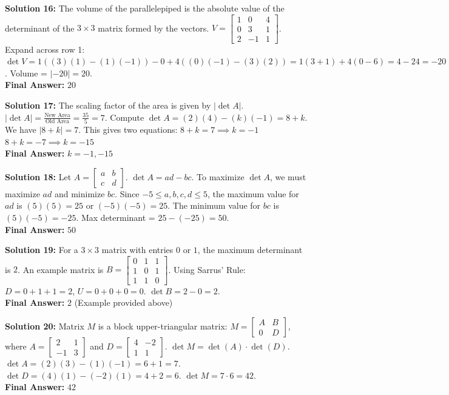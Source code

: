 \documentclass[11pt]{article}
\begin{document}
\vspace{0.5cm}
\textbf{Solution 16:}
The volume of the parallelepiped is the absolute value of the determinant of the $3 \times 3$ matrix formed by the vectors.
$V = \begin{bmatrix} 1 & 0 & 4 \\ 0 & 3 & 1 \\ 2 & -1 & 1 \end{bmatrix}$.
Expand across row 1:
$\det V = 1((3)(1) - (1)(-1)) - 0 + 4((0)(-1) - (3)(2)) = 1(3 + 1) + 4(0 - 6) = 4 - 24 = -20$.
Volume = $|-20| = 20$. \\
\textbf{Final Answer:} $20$

\vspace{0.5cm}
\textbf{Solution 17:}
The scaling factor of the area is given by $|\det A|$.
$|\det A| = \frac{\text{New Area}}{\text{Old Area}} = \frac{35}{5} = 7$.
Compute $\det A = (2)(4) - (k)(-1) = 8 + k$.
We have $|8 + k| = 7$. This gives two equations:
$8 + k = 7 \implies k = -1$
$8 + k = -7 \implies k = -15$ \\
\textbf{Final Answer:} $k = -1, -15$

\vspace{0.5cm}
\textbf{Solution 18:}
Let $A = \begin{bmatrix} a & b \\ c & d \end{bmatrix}$. $\det A = ad - bc$.
To maximize $\det A$, we must maximize $ad$ and minimize $bc$.
Since $-5 \le a,b,c,d \le 5$, the maximum value for $ad$ is $(5)(5) = 25$ or $(-5)(-5) = 25$.
The minimum value for $bc$ is $(5)(-5) = -25$.
Max determinant = $25 - (-25) = 50$. \\
\textbf{Final Answer:} $50$

\vspace{0.5cm}
\textbf{Solution 19:}
For a $3 \times 3$ matrix with entries $0$ or $1$, the maximum determinant is $2$.
An example matrix is $B = \begin{bmatrix} 0 & 1 & 1 \\ 1 & 0 & 1 \\ 1 & 1 & 0 \end{bmatrix}$.
Using Sarrus' Rule: $D = 0 + 1 + 1 = 2$, $U = 0 + 0 + 0 = 0$. $\det B = 2 - 0 = 2$. \\
\textbf{Final Answer:} $2$ (Example provided above)

\vspace{0.5cm}
\textbf{Solution 20:}
Matrix $M$ is a block upper-triangular matrix: $M = \begin{bmatrix} A & B \\ 0 & D \end{bmatrix}$, where $A = \begin{bmatrix} 2 & 1 \\ -1 & 3 \end{bmatrix}$ and $D = \begin{bmatrix} 4 & -2 \\ 1 & 1 \end{bmatrix}$.
$\det M = \det(A) \cdot \det(D)$.
$\det A = (2)(3) - (1)(-1) = 6 + 1 = 7$.
$\det D = (4)(1) - (-2)(1) = 4 + 2 = 6$.
$\det M = 7 \cdot 6 = 42$. \\
\textbf{Final Answer:} $42$
\end{document}
